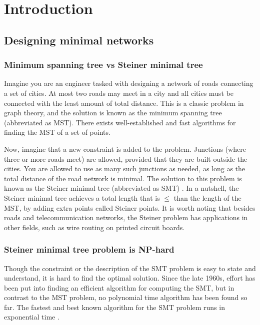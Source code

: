 \documentclass{l4proj}
\begin{document}
\def\consentname {Pieter van Tuijl}
\def\consentdate {27 March 2025}
\educationalconsent


\tableofcontents

\chapter{Introduction}


\section{Designing minimal networks}
\subsection{Minimum spanning tree vs Steiner minimal tree}
Imagine you are an engineer tasked with designing a network of roads connecting a set of cities. At most two roads may meet in a city and all cities must be connected with the least amount of total distance. This is a classic problem in graph theory, and the solution is known as the minimum spanning tree (abbreviated as MST). There exists well-established and fast algorithms for finding the MST of a set of points.

Now, imagine that a new constraint is added to the problem. Junctions (where three or more roads meet) are allowed, provided that they are built outside the cities. You are allowed to use as many such junctions as needed, as long as the total distance of the road network is minimal. The solution to this problem is known as the Steiner minimal tree (abbreviated as SMT) \citep{MelzakAlgo}.
In a nutshell, the Steiner minimal tree achieves a total length that is $\leq$ than the length of the MST, by adding extra points called Steiner points.
It is worth noting that besides roads and telecommunication networks, the Steiner problem has applications in other fields, such as wire routing on printed circuit boards.

\subsection{Steiner minimal tree problem is NP-hard}
Though the constraint or the description of the SMT problem is easy to state and understand, it is hard to find the optimal solution.
Since the late 1960s, effort has been put into finding an efficient algorithm for computing the SMT, but in contrast to the MST problem, no polynomial time algorithm has been found so far. The fastest and best known algorithm for the SMT problem runs in exponential time \citep{geosteiner96}.
\end{document}
